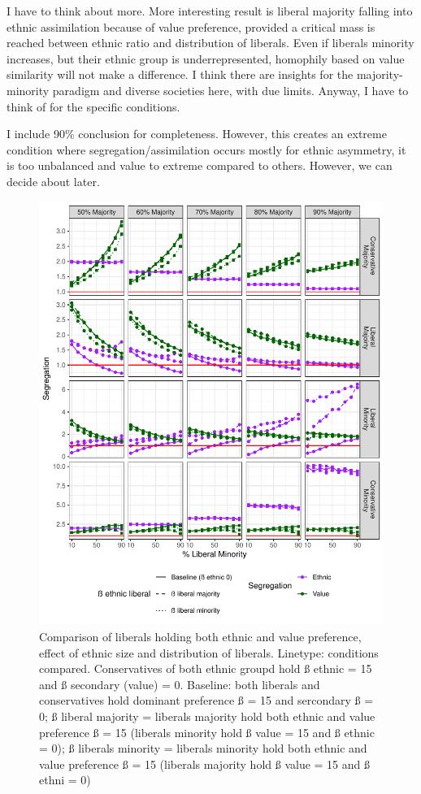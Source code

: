 \documentclass[
]{article}
\begin{document}
I have to think about more. More interesting result is liberal majority
falling into ethnic assimilation because of value preference, provided a
critical mass is reached between ethnic ratio and distribution of
liberals. Even if liberals minority increases, but their ethnic group is
underrepresented, homophily based on value similarity will not make a
difference. I think there are insights for the majority-minority
paradigm and diverse societies here, with due limits. Anyway, I have to
think of for the specific conditions.

I include 90\% conclusion for completeness. However, this creates an
extreme condition where segregation/assimilation occurs mostly for
ethnic asymmetry, it is too unbalanced and value to extreme compared to
others. However, we can decide about later.

\begin{figure}[H]

{\centering \includegraphics{ev_rum_files/figure-latex/dislib_ethnic-1} 

}

\caption{Comparison of liberals holding both ethnic and value preference, effect of ethnic size and distribution of liberals. Linetype: conditions compared. Conservatives of both ethnic groupd hold ß ethnic = 15 and ß secondary (value) = 0. Baseline: both liberals and  conservatives hold dominant preference ß = 15 and sercondary ß = 0; ß liberal majority = liberals majority hold both ethnic and value preference ß = 15 (liberals minority hold ß value = 15 and ß ethnic = 0); ß liberals minority = liberals minority hold both ethnic and value preference ß = 15 (liberals majority hold ß value = 15 and ß ethni = 0)}\label{fig:dislib_ethnic}
\end{figure}
\end{document}

